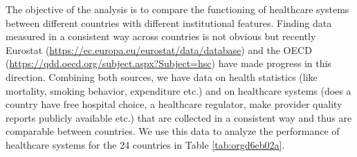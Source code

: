 \documentclass{article}
\begin{document}
The objective of the analysis is to compare the functioning of healthcare systems between different countries with different institutional features. Finding data measured in a consistent way across countries is not obvious but recently Eurostat (\url{https://ec.europa.eu/eurostat/data/database}) and the OECD (\url{https://qdd.oecd.org/subject.aspx?Subject=hsc}) have made progress in this direction. Combining both sources, we have data on health statistics (like mortality, smoking behavior, expenditure etc.) and on healthcare systems (does a country have free hospital choice, a healthcare regulator, make provider quality reports publicly available etc.) that are collected in a consistent way and thus are comparable between countries. We use this data to analyze the performance of healthcare systems for the 24 countries in Table \ref{tab:orgd6eb02a}.
\end{document}
